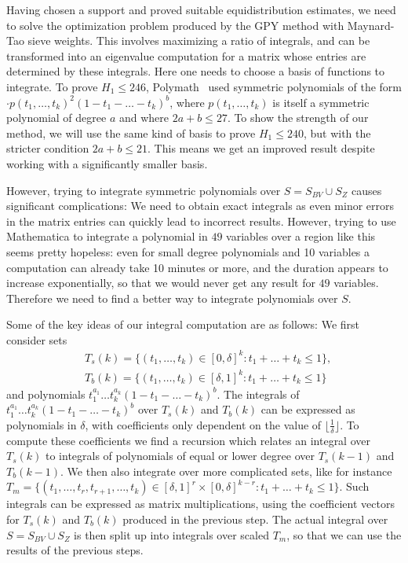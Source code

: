 \documentclass{amsart}
\numberwithin{equation}{section}
\begin{document}
 \medskip  Having chosen a support and proved suitable equidistribution estimates, we need to solve the  optimization problem produced by the GPY method with Maynard-Tao sieve weights. This involves maximizing a ratio of integrals, and can be transformed into an eigenvalue computation for a matrix whose entries are determined by these integrals. Here one needs to choose a basis of functions to integrate. To prove $H_1 \leq 246$, Polymath~\cite{Polymath:2014:VSS} used   symmetric polynomials of the form $ \cdot p(t_1, \dots, t_k)^2 (1-t_1-\dots-t_k)^b$, where $p(t_1, \dots, t_k)$ is itself a symmetric polynomial of degree $a$ and where $2a+b \leq 27$. To show the strength of our method, we will use the same kind of basis to prove $H_1 \leq 240$, but with the stricter condition $2a+b \leq 21$. This means we get an improved result despite working with a significantly smaller basis. 
 
 \medskip However, trying to integrate symmetric polynomials over $S=S_{BV} \cup S_Z$ causes significant complications: We need to obtain exact integrals as even minor errors in the matrix entries can quickly lead to incorrect results. However, trying to use Mathematica to integrate a polynomial in $49$ variables over a region like this seems pretty hopeless: even for small degree polynomials and 10 variables a computation can already take 10 minutes or more, and the duration appears to increase exponentially, so that we would never get any result for $49$ variables. Therefore we need to find a better way to integrate polynomials over $S$. 
 
 \medskip Some of the key ideas of our integral computation are as follows: We first consider sets 
 \begin{align*} 
 &T_s(k)=\{(t_1, \dots, t_k) \in [0,\delta]^k: t_1+\dots+t_k \leq 1\}, \\ 
 &T_b(k)=\{(t_1, \dots, t_k) \in [\delta,1]^k: t_1+\dots+t_k \leq 1\} 
  \end{align*} 
 and polynomials $ t_1^{a_1} \dots t_k^{a_k} (1-t_1-\dots-t_k)^b$. The integrals of $ t_1^{a_1} \dots t_k^{a_k} (1-t_1-\dots-t_k)^b$ over $T_s(k)$ and $T_b(k)$ can be expressed as polynomials in $\delta$, with coefficients only dependent on the value of $\lfloor \frac{1}{\delta} \rfloor$. To compute these coefficients we find a recursion which relates an integral over $T_s(k)$ to integrals of polynomials of equal or lower degree over $T_s(k-1)$ and $T_b(k-1)$. We then also integrate over more complicated sets, like for instance $T_m=\{(t_1, \dots, t_r, t_{r+1}, \dots, t_k) \in [\delta,1]^r\times [0,\delta]^{k-r} : t_1+\dots+t_k \leq 1\}$. Such integrals can be expressed as   matrix multiplications,   using the coefficient vectors for $T_s(k)$ and $T_b(k)$ produced in the previous step. The actual integral  over $S=S_{BV} \cup S_Z$ is then split up into integrals over scaled $T_m$, so that we can use the results of the previous steps. 
 
\end{document}
